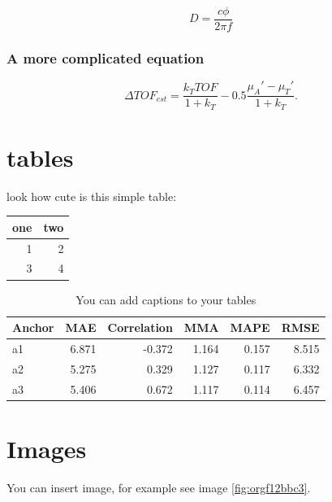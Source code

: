 \begin{equation}
\label{eq:org1f4f529}
D = \frac{c\phi}{2\pi f}
\end{equation}

\subsubsection{A more complicated equation}
\label{sec:org53a23df}

\begin{equation}
\Delta TOF_{est} = \frac{k_T TOF}{1+k_T } - 0.5 \frac{\mu_A' - \mu_T'}{1+k_T}.
\end{equation}

\section{tables}
\label{sec:org2a87668}

look how cute is this simple table:

\begin{center}
\begin{tabular}{rr}
one & two\\
\hline
1 & 2\\
3 & 4\\
\end{tabular}
\end{center}

\begin{table}[htbp]
\caption{\label{tab:org62c93b9}
You can add captions to your tables}
\centering
\begin{tabular}{lrrrrr}
Anchor & MAE & Correlation & MMA & MAPE & RMSE\\
\hline
a1 & 6.871 & -0.372 & 1.164 & 0.157 & 8.515\\
a2 & 5.275 & 0.329 & 1.127 & 0.117 & 6.332\\
a3 & 5.406 & 0.672 & 1.117 & 0.114 & 6.457\\
\end{tabular}
\end{table}

\section{Images}
\label{sec:org64be456}
You can insert image, for example see image \ref{fig:orgf12bbc3}.

